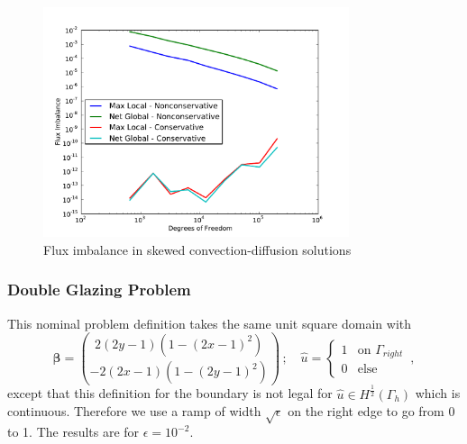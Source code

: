 \documentclass[letterpaper]{article}
\def\bbeta{\boldsymbol\beta}
\begin{document}
\begin{figure}[h!]
\centering
\includegraphics[width=0.8\textwidth]{figs/Confusion/modifiedFlux.pdf}
\caption{Flux imbalance in skewed convection-diffusion solutions}
\label{fig:confusionFlux}
\end{figure}

\subsubsection{Double Glazing Problem}
This nominal problem definition takes the same unit square domain with
\[
\bbeta=\binom{2(2y-1)(1-(2x-1)^2)}{-2(2x-1)(1-(2y-1)^2)}\,;\quad
\hat u=
\begin{cases}
1 & \mbox{on }\Gamma_{right}\\
0 & \mbox{else }
\end{cases}\,,
\]
except that this definition for the boundary is not legal for $\hat u\in
H^{\frac{1}{2}}(\Gamma_h)$ which is continuous. Therefore we use a ramp of
width $\sqrt{\epsilon}$ on the right edge to go from 0 to 1. The
results are for $\epsilon=10^{-2}$.
\end{document}

